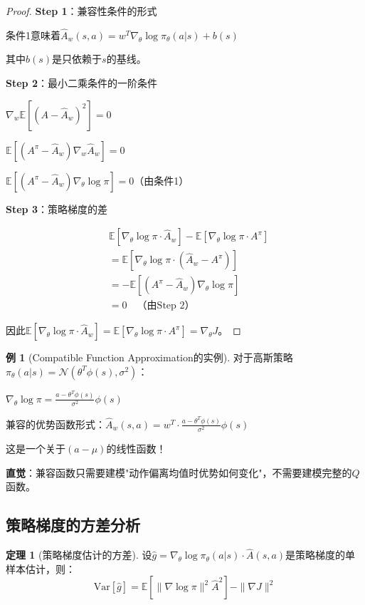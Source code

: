 \documentclass[11pt,a4paper]{article}
\theoremstyle{definition}
\newtheorem{example}{例}[section]
\newtheorem{theorem}{定理}[section]
\begin{document}
\begin{proof}
\textbf{Step 1}：兼容性条件的形式

条件1意味着$\hat{A}_w(s,a) = w^T \nabla_\theta \log \pi_\theta(a|s) + b(s)$

其中$b(s)$是只依赖于$s$的基线。

\textbf{Step 2}：最小二乘条件的一阶条件

$\nabla_w \mathbb{E}[(A - \hat{A}_w)^2] = 0$

$\mathbb{E}[(A^\pi - \hat{A}_w) \nabla_w \hat{A}_w] = 0$

$\mathbb{E}[(A^\pi - \hat{A}_w) \nabla_\theta \log \pi] = 0$（由条件1）

\textbf{Step 3}：策略梯度的差

\begin{align*}
&\mathbb{E}[\nabla_\theta \log \pi \cdot \hat{A}_w] - \mathbb{E}[\nabla_\theta \log \pi \cdot A^\pi] \\
&= \mathbb{E}[\nabla_\theta \log \pi \cdot (\hat{A}_w - A^\pi)] \\
&= -\mathbb{E}[(A^\pi - \hat{A}_w) \nabla_\theta \log \pi] \\
&= 0 \quad \text{（由Step 2）}
\end{align*}

因此$\mathbb{E}[\nabla_\theta \log \pi \cdot \hat{A}_w] = \mathbb{E}[\nabla_\theta \log \pi \cdot A^\pi] = \nabla_\theta J$。
\end{proof}

\begin{example}[Compatible Function Approximation的实例]
对于高斯策略$\pi_\theta(a|s) = \mathcal{N}(\theta^T \phi(s), \sigma^2)$：

$\nabla_\theta \log \pi = \frac{a - \theta^T \phi(s)}{\sigma^2} \phi(s)$

兼容的优势函数形式：$\hat{A}_w(s,a) = w^T \cdot \frac{a - \theta^T \phi(s)}{\sigma^2} \phi(s)$

这是一个关于$(a - \mu)$的线性函数！

\textbf{直觉}：兼容函数只需要建模"动作偏离均值时优势如何变化"，不需要建模完整的$Q$函数。
\end{example}

\subsection{策略梯度的方差分析}

\begin{theorem}[策略梯度估计的方差]
设$\hat{g} = \nabla_\theta \log \pi_\theta(a|s) \cdot \hat{A}(s,a)$是策略梯度的单样本估计，则：
\[
\text{Var}[\hat{g}] = \mathbb{E}[\|\nabla \log \pi\|^2 \hat{A}^2] - \|\nabla J\|^2
\]
\end{theorem}
\end{document}
